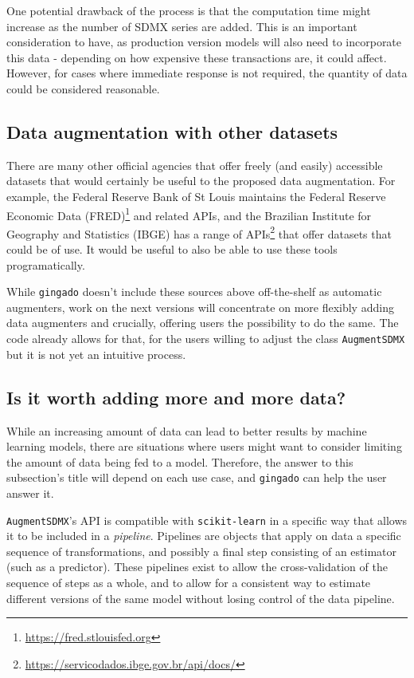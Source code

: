 \documentclass{article}
\begin{document}
One potential drawback of the process is that the computation time might increase as the number of SDMX series are added. This is an important consideration to have, as production version models will also need to incorporate this data - depending on how expensive these transactions are, it could affect. However, for cases where immediate response is not required, the quantity of data could be considered reasonable.

\subsection{Data augmentation with other datasets}

There are many other official agencies that offer freely (and easily) accessible datasets that would certainly be useful to the proposed data augmentation. For example, the Federal Reserve Bank of St Louis maintains the Federal Reserve Economic Data (FRED)\footnote{\url{https://fred.stlouisfed.org}} and related APIs, and the Brazilian Institute for Geography and Statistics (IBGE) has a range of APIs\footnote{\url{https://servicodados.ibge.gov.br/api/docs/}} that offer datasets that could be of use. It would be useful to also be able to use these tools programatically.

While \texttt{gingado} doesn't include these sources above off-the-shelf as automatic augmenters, work on the next versions will concentrate on more flexibly adding data augmenters and crucially, offering users the possibility to do the same. The code already allows for that, for the users willing to adjust the class \texttt{AugmentSDMX} but it is not yet an intuitive process.

\subsection{Is it worth adding more and more data?}
While an increasing amount of data can lead to better results by machine learning models, there are situations where users might want to consider limiting the amount of data being fed to a model. Therefore, the answer to this subsection's title will depend on each use case, and \texttt{gingado} can help the user answer it.

\texttt{AugmentSDMX}'s API is compatible with \texttt{scikit-learn} in a specific way that allows it to be included in a \textit{pipeline}. Pipelines are objects that apply on data a specific sequence of transformations, and possibly a final step consisting of an estimator (such as a predictor). These pipelines exist to allow the cross-validation of the sequence of steps as a whole, and to allow for a consistent way to estimate different versions of the same model without losing control of the data pipeline.
\end{document}
